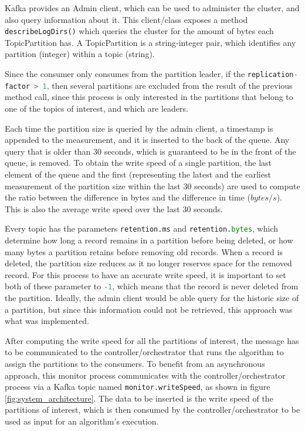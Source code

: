 Kafka provides an Admin client, which can be used to administer the cluster, and
also query information about it. This client/class exposes a method
\lstinline[language=Python]{describeLogDirs()} which queries the cluster for the
amount of bytes each TopicPartition has. A TopicPartition is a string-integer
pair, which identifies any partition (integer) within a topic (string). 

Since the consumer only consumes from the partition leader, if the
\lstinline[language=Python]{replication-factor > 1}, then several partitions are
excluded from the result of the previous method call, since this process is only
interested in the partitions that belong to one of the topics of interest, and
which are leaders.

Each time the partition size is queried by the admin client, a timestamp is
appended to the measurement, and it is inserted to the back of the queue. Any
query that is older than $30$ seconds, which is guaranteed to be in the front of the
queue, is removed. To obtain the write speed of a single partition, the last
element of the queue and the first (representing the latest and the earliest
measurement of the partition size within the last $30$ seconds) are used to compute the
ratio between the difference in bytes and the difference in time ($bytes/s$).
This is also the average write speed over the last 30 seconds.

Every topic has the parameters \lstinline[language=Python]{retention.ms} and
\lstinline[language=Python]{retention.bytes}, which determine how long a record
remains in a partition before being deleted, or how many bytes a partition
retains before removing old records. When a record is deleted, the partition
size reduces as it no longer reserves space for the removed record. For this
process to have an accurate write speed, it is important to set both of these
parameter to \lstinline[language=Python]{-1}, which means that the record is
never deleted from the partition. Ideally, the admin client would be able query
for the historic size of a partition, but since this information could not be
retrieved, this approach was what was implemented.

After computing the write speed for all the partitions of interest, the message
has to be communicated to the controller/orchestrator that runs the algorithm to
assign the partitions to the consumers. To benefit from an asynchronous
approach, this monitor process communicates with the controller/orchestrator
process via a Kafka topic named \lstinline{monitor.writeSpeed}, as shown in
figure \ref{fig:system_architecture}. The data to be inserted is the write speed
of the partitions of interest, which is then consumed by the
controller/orchestrator to be used as input for an algorithm's execution.

